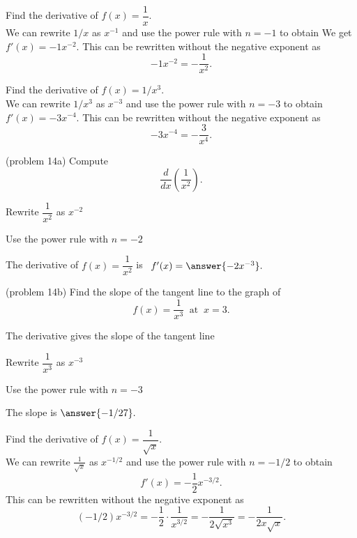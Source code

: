 \documentclass{ximera}
\begin{document}
\begin{example}[example 13]
Find the derivative of $f(x) = \dfrac{1}{x}$.\\
We can rewrite $1/x$ as $x^{-1}$ and use the power rule with $n = -1$ to obtain 
We get $f'(x) = -1x^{-2}$.
This can be rewritten without the negative exponent as
\[ 
-1x^{-2} = -\frac{1}{x^2}.
\]
\end{example}



\begin{example}[example 14]
Find the derivative of $f(x) = 1/x^3$.\\
We can rewrite $1/x^3$ as $x^{-3}$ and use the power rule with $n = -3$ to obtain 
$f'(x) = -3x^{-4}$.
This can be rewritten without the negative exponent as
\[
-3x^{-4} = -\frac{3}{x^4}.
\]
\end{example}




\begin{problem}(problem 14a)
Compute
\[
\frac{d}{dx} \left(\frac{1}{x^2}\right).
\]
\begin{hint}
Rewrite $\dfrac{1}{x^2}$ as $x^{-2}$
\end{hint}
\begin{hint}
Use the power rule with $n = -2$
\end{hint}
The derivative of $f(x) = \dfrac{1}{x^2}$ is \ $f'(x) = \answer{-2x^{-3}}.$
\end{problem}




\begin{problem}(problem 14b)
Find the slope of the tangent line to the graph of 
\[
f(x) = \frac{1}{x^3} \;\; \text{at} \;\; x = 3.
\]


\begin{hint}
The derivative gives the slope of the tangent line
\end{hint}
\begin{hint}
Rewrite $\dfrac{1}{x^3}$ as $x^{-3}$
\end{hint}
\begin{hint}
Use the power rule with $n = -3$
\end{hint}
The slope is  $\answer{-1/27}.$
\end{problem}




\begin{example}[example 15]
Find the derivative of $f(x) = \dfrac{1}{\sqrt x}$.\\
We can rewrite $\frac{1}{\sqrt x}$ as $x^{-1/2}$ and use the power rule with $n = -1/2$ to obtain
\[
f'(x) = -\frac12 x^{-3/2}.
\]
This can be rewritten without the negative exponent as
\[
(-1/2)x^{-3/2}= -\frac{1}{2} \cdot \frac{1}{x^{3/2}} = -\frac{1}{2\sqrt{x^3}} = -\frac{1}{2x\sqrt x}.
\]
\end{example}
\end{document}
